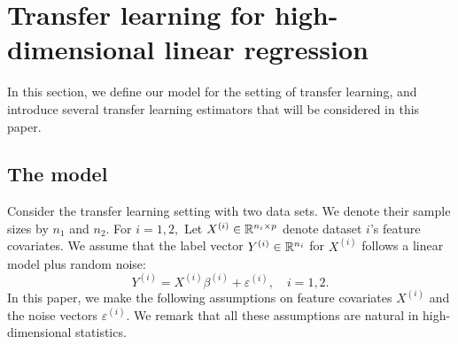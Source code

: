 \documentclass[aos,preprint]{imsart}
\begin{document}
\section{Transfer learning for high-dimensional linear regression}\label{sec_HPS}
In this section, we define our model for the setting of transfer learning, and introduce several transfer learning estimators that will be considered in this paper. 

\subsection{The model}
Consider the transfer learning setting with two data sets. We denote their sample sizes by $n_1$ and $n_2$. For $i=1,2,$ Let $X^{(i)} \in \mathbb{R}^{n_i \times p}$ denote dataset $i$'s feature covariates. We assume that the label vector $Y^{(i)} \in \mathbb{R}^{n_i}$ for $X^{(i)}$ follows a linear model plus random noise:
$$Y^{(i)}= X^{(i)}\beta^{(i)} + \varepsilon^{(i)},\quad i=1,2.$$
In this paper, we make the following assumptions on feature covariates $X^{(i)}$ and the noise vectors $\varepsilon^{(i)}$. We remark that all these assumptions are natural in high-dimensional statistics. 
\end{document}
